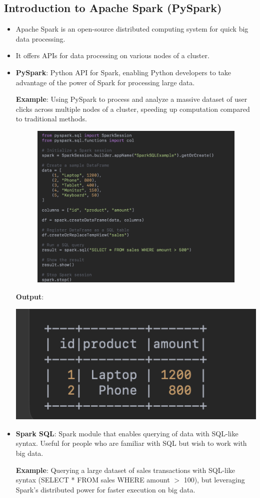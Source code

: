\documentclass{article}
\begin{document}
\subsection{Introduction to Apache Spark (PySpark)}
\begin{itemize}
\item Apache Spark is an open-source distributed computing system for quick big data processing.
\item It offers APIs for data processing on various nodes of a cluster.
\item \textbf{PySpark}: Python API for Spark, enabling Python developers to take advantage of the power of Spark for processing large data.

\textbf{Example}: Using PySpark to process and analyze a massive dataset of user clicks across multiple nodes of a cluster, speeding up computation compared to traditional methods.

\includegraphics[width=14cm,height=8cm]{PySpark.png}

\textbf{Output}:

\includegraphics[width=14cm,height=3
cm]{PySpark_Output.png}
\item \textbf{Spark SQL}: Spark module that enables querying of data with SQL-like syntax. Useful for people who are familiar with SQL but wish to work with big data.

\textbf{Example}: Querying a large dataset of sales transactions with SQL-like syntax (SELECT * FROM sales WHERE amount $>$ 100), but leveraging Spark’s distributed power for faster execution on big data.


\end{itemize}
\end{document}

